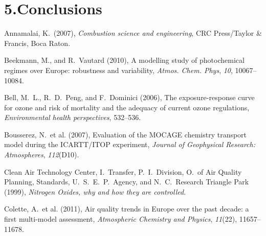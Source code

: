 \documentclass[9pt]{report}
\begin{document}
\section{5.\hspace*{0.5em}Conclusions}\label{sec-conclusions}%

{\mdsupressbiblabel{}\begin{thebibliography}{28}%
\label{sec-bibliography}%

\mdbibitemlabel{}Annamalai, K.~(2007), \emph{Combustion science and engineering}, CRC Press/Taylor \& Francis, Boca Raton.\label{annamalai2007combustion}%

\mdbibitemlabel{}Beekmann, M., and R.~Vautard (2010), A modelling study of photochemical regimes over Europe: robustness and variability, \emph{Atmos. Chem. Phys}, \emph{10}, 10067–10084.\label{beekmann2010modelling}%

\mdbibitemlabel{}Bell, M.~L., R.~D.~Peng, and F.~Dominici (2006), The exposure-response curve for ozone and risk of mortality and the adequacy of current ozone regulations, \emph{Environmental health perspectives}, 532–536.\label{bell2006exposure}%

\mdbibitemlabel{}Bousserez, N.~et al. (2007), Evaluation of the MOCAGE chemistry transport model during the ICARTT/ITOP experiment, \emph{Journal of Geophysical Research: Atmospheres}, \emph{112}(D10).\label{bousserez2007evaluation}%

\mdbibitemlabel{}Clean Air Technology Center, I.~Transfer, P.~I.~Division, O.~of Air Quality Planning, Standards, U.~S.~E.~P.~Agency, and N.~C.~Research Triangle Park (1999), \emph{Nitrogen Oxides, why and how they are controlled}.\label{epabulletin}%

\mdbibitemlabel{}Colette, A.~et al. (2011), Air quality trends in Europe over the past decade: a first multi-model assessment, \emph{Atmospheric Chemistry and Physics}, \emph{11}(22), 11657–11678.\label{colette2011air}%


\end{thebibliography}}
\end{document}
